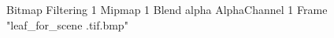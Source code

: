 {Bitmap
	{Filtering 1}
	{Mipmap 1}
	{Blend alpha}
	{AlphaChannel 1}
	{Frame "leaf_for_scene .tif.bmp"}
}
